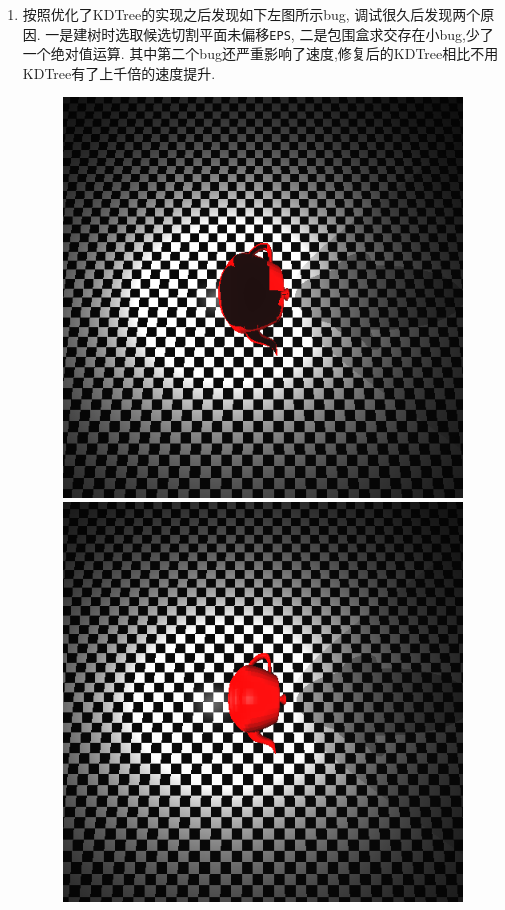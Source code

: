\begin{enumerate}
  \item 按照\cite{kdtree}优化了KDTree的实现之后发现如下左图所示bug, 调试很久后发现两个原因.
    一是建树时选取候选切割平面未偏移\verb|EPS|, 二是包围盒求交存在小bug,少了一个绝对值运算.
    其中第二个bug还严重影响了速度,修复后的KDTree相比不用KDTree有了上千倍的速度提升.
    \begin{figure}[H]
      \centering
      \begin{minipage}[b]{0.46\linewidth}
        \centering
        \includegraphics[width=\textwidth]{img/bug_teapot.png}
      \end{minipage}
      \begin{minipage}[b]{0.46\linewidth}
        \centering
        \includegraphics[width=\textwidth]{img/fixed_teapot.png}

\end{minipage}
\end{figure}
\end{enumerate}
